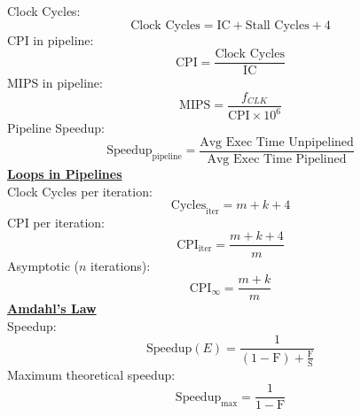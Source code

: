 \documentclass[a4paper,12pt]{article}
\begin{document}
\begin{multicols}{2}
\begin{equation*}
    \end{equation*}
    Clock Cycles:
    \begin{equation*}
        \text{Clock Cycles} = \text{IC} + \text{Stall Cycles} + 4
    \end{equation*}
    CPI in pipeline:
    \begin{equation*}
        \text{CPI} = \frac{\text{Clock Cycles}}{\text{IC}}
    \end{equation*}
    MIPS in pipeline:
    \begin{equation*}
        \text{MIPS} = \frac{f_{CLK}}{\text{CPI} \times 10^6}
    \end{equation*}
    Pipeline Speedup:
    \begin{equation*}
        \text{Speedup}_{\text{pipeline}} = \frac{\text{Avg Exec Time Unpipelined}}{\text{Avg Exec Time Pipelined}}
    \end{equation*}
    \textbf{\underline{Loops in Pipelines}}
    \\
    Clock Cycles per iteration:
    \begin{equation*}
        \text{Cycles}_{\text{iter}} = m + k + 4
    \end{equation*}
    CPI per iteration:
    \begin{equation*}
        \text{CPI}_{\text{iter}} = \frac{m+k+4}{m}
    \end{equation*}
    Asymptotic ($n$ iterations):
    \begin{equation*}
        \text{CPI}_{\infty} = \frac{m+k}{m}
    \end{equation*}
    \textbf{\underline{Amdahl's Law}}
    \\
    Speedup:
    \begin{equation*}
        \text{Speedup}(E) = \frac{1}{(1-\text{F})+\frac{\text{F}}{\text{S}}}
    \end{equation*}
    Maximum theoretical speedup:
    \begin{equation*}
        \text{Speedup}_{\max} = \frac{1}{1-\text{F}}
    \end{equation*}

    \end{multicols}


\end{document}
